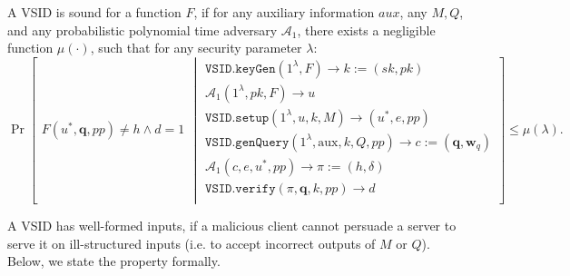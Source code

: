 \begin{definition}\label{deff::VSID-Soundness}  A VSID  is sound for a function $F$, if for any auxiliary information $aux$, any $M,Q$, and any probabilistic polynomial time adversary $\mathcal{A}_{\scriptscriptstyle 1}$, there exists a negligible function $\mu(\cdot)$, such that for any security parameter $\lambda$: 
\small{
$$ \Pr\left[
  \begin{array}{l}
F(u^{\scriptscriptstyle *}, \bm{q},{pp})\neq h \wedge d=1
\end{array} \middle |
    \begin{array}{l}
    \mathtt{VSID.keyGen}(1^{\lambda},F)\rightarrow k:=(sk,pk)\\
    \mathcal{A}_{\scriptscriptstyle 1}(1^{\scriptscriptstyle\lambda},pk, F)\rightarrow u\\
    \mathtt{VSID.setup}(1^{\lambda}, u, k, M)\rightarrow (u^{\scriptscriptstyle *},e,{pp})\\
    \mathtt{VSID.genQuery}(1^{\lambda},  \text{aux},k,Q,{pp})\rightarrow c:=(\bm{q}, \bm{w}_{q})\\
     \mathcal{A}_{\scriptscriptstyle 1}(c,e, u^{\scriptscriptstyle *},{pp})\rightarrow \pi:=(h,\delta)\\
     \mathtt{VSID.verify}(\pi,\bm{q},k,{pp})\rightarrow d\\
\end{array}    \right]\leq \mu(\lambda).$$
}
\end{definition}


A VSID has   well-formed inputs, if a malicious client cannot persuade a server to serve it on  ill-structured inputs (i.e. to accept  incorrect outputs of $M$ or $Q$). Below, we state the property formally.

